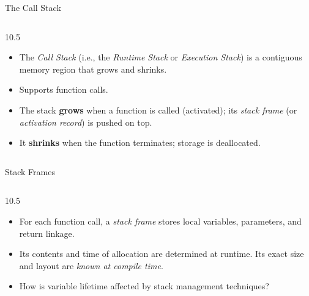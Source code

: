 \documentclass[14pt,aspectratio=1610]{beamer}
\begin{document}
\begin{frame}{The Call Stack}
\begin{columns}
  \begin{overlayarea}{\linewidth}{10.5\baselineskip}
  \begin{itemize}[<+->]
  \item
    The \emph{Call Stack} (i.e., the \textit{Runtime Stack} or \textit{Execution Stack}) is a contiguous memory region that grows and shrinks.
  \item
    Supports function calls.
  \item
    The stack \textbf{grows} when a function is called (activated); its \emph{stack frame} 
    (or \emph{activation record}) is pushed on top.
  \item
    It \textbf{shrinks} when the function terminates; storage is
    deallocated.
  \end{itemize}
  \end{overlayarea}
  \vspace{1.5em}
  
\end{columns}
\end{frame}

\begin{frame}{Stack Frames}
\begin{columns}
  \begin{overlayarea}{\linewidth}{10.5\baselineskip}
  \begin{itemize}
  \item
    For each function call, a \emph{stack frame} stores local variables, parameters, and
    return linkage.
  \item
    Its contents and time of allocation are determined at runtime. Its exact
  size and layout are \emph{known at compile time}.
  \item
    How is variable lifetime affected by stack management techniques?
  \end{itemize}
  \end{overlayarea}
  \vspace{1.5em}
  
\end{columns}
\end{frame}
\end{document}
